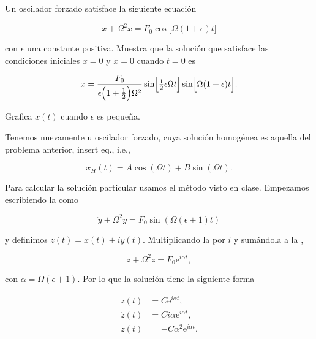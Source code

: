\documentclass[../main.tex]{subfiles}
\begin{document}
\begin{problema}
	Un oscilador forzado satisface la siguiente ecuación

	\begin{equation}
		\ddot{x} + \Omega^{2}x = F_{0}\cos \biggl[\Omega(1 + \epsilon)t\biggr]
	\end{equation}

	con \(\epsilon\) una constante positiva. Muestra que la solución
	que satisface las condiciones iniciales \(x = 0\) y
	\(\dot{x} = 0\) cuando \(t = 0\) es

	\begin{equation}
		x = \dfrac{F_{0}}{\epsilon \Bigl(1 + \tfrac{1}{2}\Bigr)\Omega^{2}}\sin \Bigl[\tfrac{1}{2}\epsilon\Omega t\Bigr]\sin \Bigl[\Omega(1 + \epsilon)t\Bigr].
	\end{equation}

	Grafica \(x(t)\) cuando \(\epsilon\) es pequeña.
\end{problema}

\startsolution

Tenemos nuevamente u oscilador forzado, cuya solución homogénea es aquella del problema anterior, insert eq., i.e.,

\begin{equation}
	x_{H}(t) =A\cos(\Omega t) + B\sin(\Omega t).
	\label{eq:homogeneous-sol}
\end{equation}

Para calcular la solución particular usamos el método visto en clase. Empezamos escribiendo la 
como

\begin{equation}
	\ddot{y} + \Omega^{2}y = F_{0}\sin(\Omega(\epsilon + 1)t)
	\label{eq:h-sol-in-y}
\end{equation}

y definimos \(z(t) = x(t) + i y(t)\). Multiplicando la  por \(i\) y
sumándola a la ,

\begin{equation}
	\ddot{z} + \Omega^{2}z = F_{0}\mathrm{e}^{i\alpha t},
	\label{eq:complex-sol}
\end{equation}

con \(\alpha = \Omega(\epsilon + 1)\). Por lo que la solución tiene la siguiente forma

\begin{align}
	z(t)        & = C \mathrm{e}^{i\alpha t},\label{eq:z-sol}    \\
	\dot{z}(t)  & = Ci\alpha \mathrm{e}^{i\alpha t},\nonumber    \\
	\ddot{z}(t) & = -C\alpha^{2}\mathrm{e}^{i\alpha t}.\nonumber
\end{align}
\end{document}
